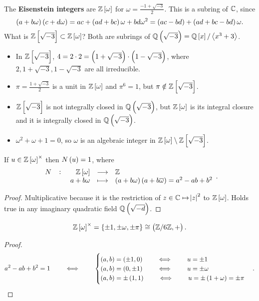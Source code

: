The \textbf{Eisenstein integers} are $ \Z\sbr{\omega} $ for $ \omega = \tfrac{-1 + \sqrt{-3}}{2} $. This is a subring of $ \mathbb{C} $, since
$$ \br{a + b\omega}\br{c + d\omega} = ac + \br{ad + bc}\omega + bd\omega^2 = \br{ac - bd} + \br{ad + bc - bd}\omega. $$
What is $ \Z\sbr{\sqrt{-3}} \subset \Z\sbr{\omega} $? Both are subrings of $ \Q\br{\sqrt{-3}} = \Q\sbr{x} / \abr{x^3 + 3} $.
\begin{itemize}
\item In $ \Z\sbr{\sqrt{-3}} $, $ 4 = 2 \cdot 2 = \br{1 + \sqrt{-3}} \cdot \br{1 - \sqrt{-3}} $, where $ 2, 1 + \sqrt{-3}, 1 - \sqrt{-3} $ are all irreducible.
\item $ \pi = \tfrac{1 + \sqrt{-3}}{2} $ is a unit in $ \Z\sbr{\omega} $ and $ \pi^6 = 1 $, but $ \pi \notin \Z\sbr{\sqrt{-3}} $.
\item $ \Z\sbr{\sqrt{-3}} $ is not integrally closed in $ \Q\br{\sqrt{-3}} $, but $ \Z\sbr{\omega} $ is its integral closure and it is integrally closed in $ \Q\br{\sqrt{-3}} $.
\item $ \omega^2 + \omega + 1 = 0 $, so $ \omega $ is an algebraic integer in $ \Z\sbr{\omega} \setminus \Z\sbr{\sqrt{-3}} $.
\end{itemize}

\begin{proposition}
If $ u \in \Z\sbr{\omega}^\times $ then $ N\br{u} = 1 $, where
$$ \function[N]{\Z\sbr{\omega}}{\Z}{a + b\omega}{\br{a + b\omega}\br{a + b\overline{\omega}} = a^2 - ab + b^2}. $$
\end{proposition}

\begin{proof}
Multiplicative because it is the restriction of $ z \in \mathbb{C} \mapsto \abs{z}^2 $ to $ \Z\sbr{\omega} $. Holds true in any imaginary quadratic field $ \Q\br{\sqrt{-d}} $.
\end{proof}

\begin{theorem}
$$ \Z\sbr{\omega}^\times = \cbr{\pm 1, \pm\omega, \pm\pi} \cong \br{\Z / 6\Z, +}. $$
\end{theorem}

\begin{proof}
$$ a^2 - ab + b^2 = 1 \qquad \iff \qquad
\begin{cases}
\br{a, b} = \br{\pm 1, 0} \qquad \iff \qquad u = \pm 1 \\
\br{a, b} = \br{0, \pm 1} \qquad \iff \qquad u = \pm\omega \\
\br{a, b} = \pm\br{1, 1} \qquad \iff \qquad u = \pm\br{1 + \omega} = \pm\pi
\end{cases}.
$$
\end{proof}

